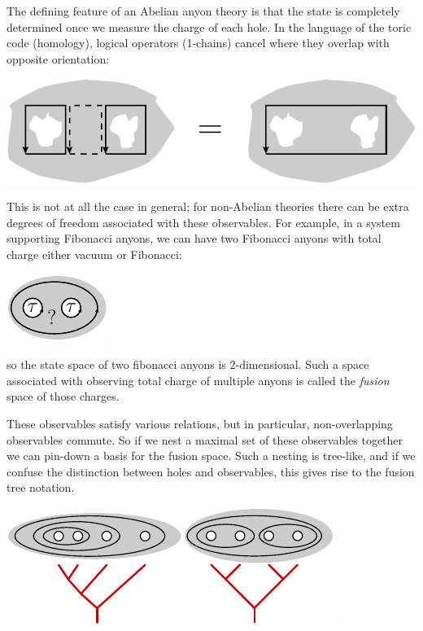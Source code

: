 \documentclass[aps, prl, letterpaper, twocolumn, superscriptaddress, notitlepage, 10pt]{revtex4-1}
\begin{document}
The defining feature of an Abelian anyon theory
is that the state is completely determined once
we measure the charge of each hole.
In the language of the toric code (homology),
logical operators (1-chains)
cancel where they overlap
with opposite orientation:
\begin{center}
\includegraphics[width=0.7\columnwidth]{pic-abelian.pdf}
\end{center}

This is not at all the case in general;
for non-Abelian theories there can be extra
degrees of freedom associated with these
observables. For example, in
a system supporting Fibonacci anyons,
we can have two Fibonacci anyons with total
charge either vacuum or Fibonacci:
\begin{center}
\includegraphics[]{pic-fusion.pdf}
\end{center}
so the state space of two fibonacci anyons
is $2$-dimensional.
Such a space associated with observing total charge
of multiple anyons is called the \emph{fusion} space
of those charges.

These observables satisfy various relations,
but in particular, non-overlapping observables commute.
So if we nest a maximal set of these observables together
we can pin-down a basis for the fusion space.
Such a nesting is tree-like, and if we confuse the distinction
between holes and observables, this gives rise to the
fusion tree notation.
\begin{center}
\includegraphics[]{pic-tree-0.pdf}\includegraphics[]{pic-tree-1.pdf}
\end{center}
\end{document}
